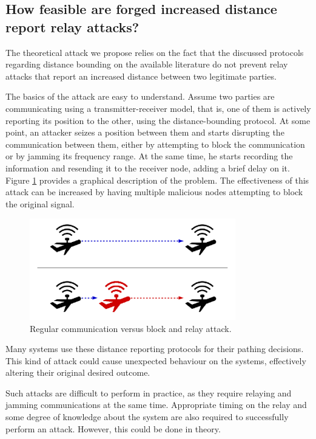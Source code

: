 \documentclass{article}
\begin{document}
\subsection{How feasible are forged increased distance report relay attacks?}

The theoretical attack we propose relies on the fact that the discussed protocols regarding distance bounding on the available literature do not prevent relay attacks that report an increased distance between two legitimate parties.

The basics of the attack are easy to understand. Assume two parties are communicating using a transmitter-receiver model, that is, one of them is actively reporting its position to the other, using the distance-bounding protocol. At some point, an attacker seizes a position between them and starts disrupting the communication between them, either by attempting to block the communication or by jamming its frequency range. At the same time, he starts recording the information and resending it to the receiver node, adding a brief delay on it. Figure \ref{fig:attackexample1} provides a graphical description of the problem. The effectiveness of this attack can be increased by having multiple malicious nodes attempting to block the original signal.

\begin{figure}[h!]
  \centering
    \includegraphics[width=0.8\textwidth]{images/attack1.png}
  \caption{Regular communication versus block and relay attack.}
  \label{fig:attackexample1}
\end{figure}

Many systems use these distance reporting protocols for their pathing decisions. This kind of attack could cause unexpected behaviour on the systems, effectively altering their original desired outcome. 

Such attacks are difficult to perform in practice, as they require relaying and jamming communications at the same time. Appropriate timing on the relay and some degree of knowledge about the system are also required to successfully perform an attack. However, this could be done in theory.
\end{document}
